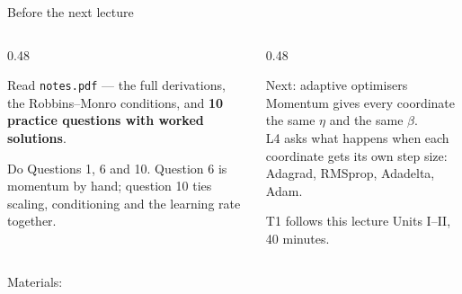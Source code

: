 \documentclass[aspectratio=169]{beamer}
\begin{document}
\begin{frame}[shrink=3]{Before the next lecture}
  \begin{columns}[T]
    \begin{column}{0.48\textwidth}
      \begin{block}{Read}
        \texttt{notes.pdf} --- the full derivations, the Robbins--Monro
        conditions, and \textbf{10 practice questions with worked solutions}.
      \end{block}
      \begin{block}{Do}
        Questions 1, 6 and 10. Question 6 is momentum by hand; question 10 ties
        scaling, conditioning and the learning rate together.
      \end{block}
    \end{column}
    \begin{column}{0.48\textwidth}
      \begin{exampleblock}{Next: adaptive optimisers}
        Momentum gives every coordinate the same $\eta$ and the same
        $\beta$.\\[0.3em]
        L4 asks what happens when each coordinate gets its own step size:
        Adagrad, RMSprop, Adadelta, Adam.
      \end{exampleblock}
      \begin{alertblock}{T1 follows this lecture}
        Units I--II, 40 minutes.
      \end{alertblock}
    \end{column}
  \end{columns}
  \begin{center}
    \small Materials: \texttt{\AMLRepoURL}
  \end{center}
  \slidesources{\AMLUnitIIISources}
\end{frame}
\end{document}
